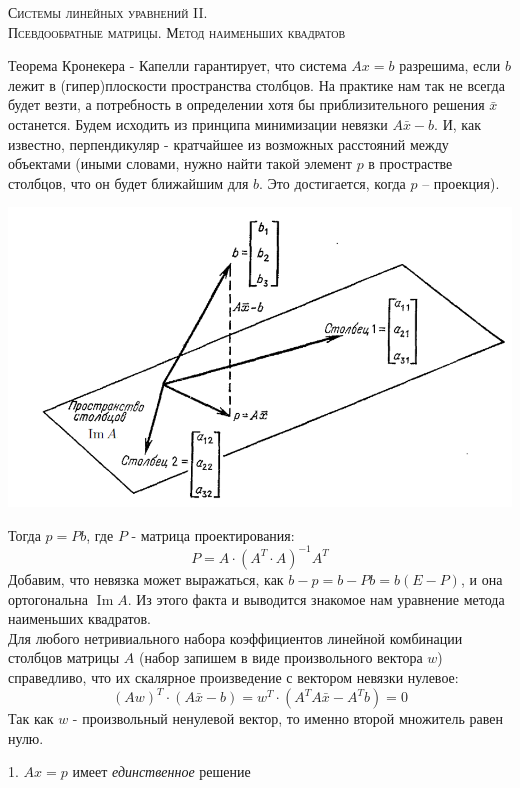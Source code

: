 \documentclass[a4paper,12pt]{article}
\begin{document}
\newpage
\begin{center}
    \textsc{Системы линейных уравнений II. \\
    Псевдообратные матрицы. Метод наименьших квадратов}
\end{center}
Теорема Кронекера - Капелли гарантирует, что система $Ax = b$ разрешима, если $b$ лежит в (гипер)плоскости пространства столбцов. На практике нам так не всегда будет везти, а потребность в определении хотя бы приблизительного решения $\bar{x}$ останется. Будем исходить из принципа минимизации невязки $A\bar{x} - b$. И, как известно, перпендикуляр - кратчайшее из возможных расстояний между объектами (иными словами, нужно найти такой элемент $p$ в прострастве столбцов, что он будет ближайшим для $b$. Это достигается, когда $p$ -- проекция). \\
\begin{center}
    \includegraphics[width = 14 cm]{mnk.png}
\end{center}
Тогда $p = Pb$, где $P$ - матрица проектирования:
\[ P = A \cdot (A^T \cdot A)^{-1} A^T\]
Добавим, что невязка может выражаться, как $ b - p = b - Pb = b(E - P)$, и она ортогональна $\operatorname{Im} A$. Из этого факта и выводится знакомое нам уравнение метода наименьших квадратов. \\
Для любого нетривиального набора коэффициентов линейной комбинации столбцов матрицы $A$ (набор запишем в виде произвольного вектора $w$) справедливо, что их скалярное произведение с вектором невязки нулевое:
\[ (Aw)^T \cdot (A\bar{x} - b) = w^T \cdot (A^TA\bar{x} - A^Tb) = 0\]
Так как $w$ - произвольный ненулевой вектор, то именно второй множитель равен нулю. 
\begin{center}
   1. $Ax = p$ имеет \textit{единственное} решение
\end{center}
\end{document}
